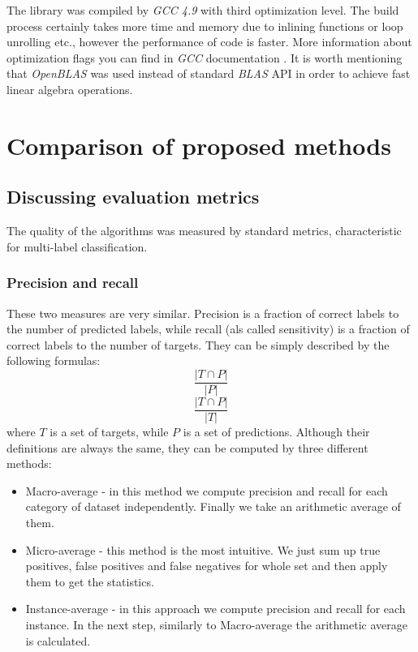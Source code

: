 The library was compiled by \textit{GCC 4.9} with third optimization level. The build process certainly takes more time and memory due to inlining functions or loop unrolling etc., however the performance of code is faster. More information about optimization flags you can find in \textit{GCC} documentation \cite{Opt}. It is worth mentioning that \textit{OpenBLAS} was used instead of standard \textit{BLAS} API in order to achieve fast linear algebra operations. 

\section{Comparison of proposed methods}
\subsection{Discussing evaluation metrics}


The quality of the algorithms was measured by standard metrics, characteristic for multi-label classification.

\subsubsection{Precision and recall} 

These two measures are very similar. Precision is a fraction of correct labels to the number of predicted labels, while recall (als called sensitivity) is a fraction of correct labels to the number of targets. They can be simply described by the following formulas:  
\begin{equation}
\label{eq:exp2}
\frac{|T \cap P|}{|P|}
\end{equation}
\begin{equation}
\label{eq:exp3}
\frac{|T \cap P|}{|T|}
\end{equation}
where $T$ is a set of targets, while $P$ is a set of predictions. Although their definitions are always the same, they can be computed by three different methods:
\begin{itemize}
\item Macro-average - in this method we compute precision and recall for each category of dataset independently. Finally we take an arithmetic average of them.
\item Micro-average - this method is the most intuitive. We just sum up true positives, false positives and false negatives for whole set and then apply them to get the statistics. 
\item Instance-average - in this approach we compute precision and recall for each instance. In the next step, similarly to Macro-average the arithmetic average is calculated.
\end{itemize}

